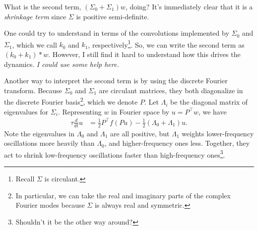 \documentclass{article}
\begin{document}
What is the second term, $(\Sigma_0 + \Sigma_1) w$, doing?
It's immediately clear that it is a \emph{shrinkage term} since $\Sigma$ is positive semi-definite.


One could try to understand in terms of the convolutions implemented by $\Sigma_0$ and $\Sigma_1$, which we call $k_0$ and $k_1$, respectively\footnote{Recall $\Sigma$ is circulant.}. 
So, we can write the second term as $(k_0 + k_1) * w$.
However, I still find it hard to understand how this drives the dynamics.
\emph{I could use some help here.}

Another way to interpret the second term is by using the discrete Fourier transform.
Because $\Sigma_0$ and $\Sigma_1$ are circulant matrices, they both diagonalize in the discrete Fourier basis\footnote{In particular, we can take the real and imaginary parts of the complex Fourier modes because $\Sigma$ is always real and symmetric.}, which we denote $P$.
Let $\Lambda_i$ be the diagonal matrix of eigenvalues for $\Sigma_i$.
Representing $w$ in Fourier space by $u = P^\top w$, we have
\begin{align}
  \tau \frac{d}{dt} u
  &= \frac{1}{2} P^\top f(P u) - \frac{1}{2} ( \Lambda_0 + \Lambda_1 ) u.
  \label{eq:dudt}
\end{align}
Note the eigenvalues in $\Lambda_0$ and $\Lambda_1$ are all positive, but $\Lambda_1$ weights lower-frequency oscillations more heavily than $\Lambda_0$, and higher-frequency ones less.
Together, they act to shrink low-frequency oscillations faster than high-frequency ones\footnote{Shouldn't it be the other way around?}.
\end{document}
